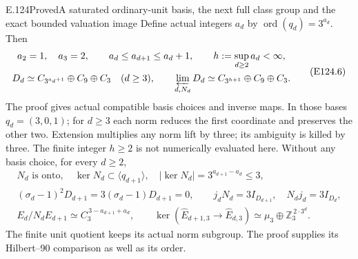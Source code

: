 \begin{statement}{E.124}{Proved}{A saturated ordinary-unit basis, the next full class group and the exact bounded valuation image}
Define actual integers $a_d$ by $\operatorname{ord}(q_d)=3^{a_d}$.
Then
\[
 \begin{gathered}
 a_2=1,\quad a_3=2,\qquad
 a_d\le a_{d+1}\le a_d+1,\qquad h:=\sup_{d\ge2}a_d<\infty,\\
 D_d\simeq C_{3^{a_d+1}}\oplus C_9\oplus C_3\quad(d\ge3),
 \qquad
 \varprojlim_{d,N_d}D_d\simeq C_{3^{h+1}}\oplus C_9\oplus C_3.
 \end{gathered}
 \tag{E124.6}
\]
The proof gives actual compatible basis choices and inverse maps.
In those bases $q_d=(3,0,1)$; for $d\ge3$ each norm reduces the
first coordinate and preserves the other two. Extension multiplies
any norm lift by three; its ambiguity is killed by three.
The finite integer $h\ge2$ is not numerically evaluated here.
Without any basis choice, for every $d\ge2$,
\[
 \begin{gathered}
 N_d\text{ is onto},\quad
 \ker N_d\subset\langle q_{d+1}\rangle,\quad
 |\ker N_d|=3^{a_{d+1}-a_d}\le3,\\
 (\sigma_d-1)^2D_{d+1}=3(\sigma_d-1)D_{d+1}=0,\qquad
 j_dN_d=3I_{D_{d+1}},\quad N_dj_d=3I_{D_d},\\
 E_d/N_dE_{d+1}\simeq C_3^{\,3-a_{d+1}+a_d},\qquad
 \ker(\widehat E_{d+1,3}\to\widehat E_{d,3})
                   \simeq\mu_3\oplus\mathbb Z_3^{\,2\cdot3^d}.
 \end{gathered}
 \tag{E124.7}
\]
The finite unit quotient keeps its actual norm subgroup. The
proof supplies its Hilbert--90 comparison as well as its order.


\end{statement}
